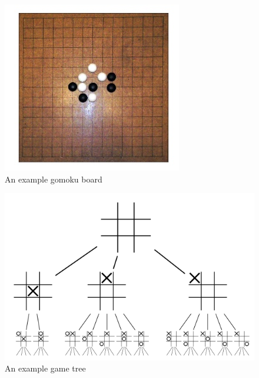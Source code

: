 \begin{figure}[ht]
    \centering
    \includegraphics[scale=0.5]{images/gomoku_board.png}
    \caption{An example gomoku board}
    \label{fig:board}
\end{figure}

\begin{figure}[ht]
    \centering
    \includegraphics[scale=0.40]{images/gametree.png}
    \caption{An example game tree}
    \label{fig:gametree}
\end{figure}


